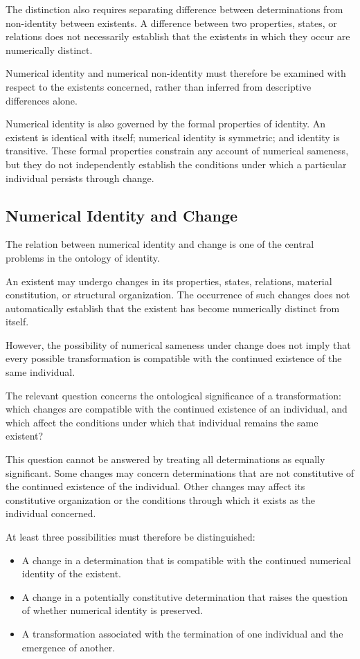 The distinction also requires separating
difference between determinations from
non-identity between existents. A difference
between two properties, states, or relations
does not necessarily establish that the
existents in which they occur are numerically
distinct.

Numerical identity and numerical non-identity
must therefore be examined with respect to
the existents concerned, rather than inferred
from descriptive differences alone.

Numerical identity is also governed by the
formal properties of identity. An existent
is identical with itself; numerical identity
is symmetric; and identity is transitive.
These formal properties constrain any
account of numerical sameness, but they
do not independently establish the conditions
under which a particular individual persists
through change.

\subsection{Numerical Identity and Change}

The relation between numerical identity
and change is one of the central problems
in the ontology of identity.

An existent may undergo changes in its
properties, states, relations, material
constitution, or structural organization.
The occurrence of such changes does not
automatically establish that the existent
has become numerically distinct from itself.

However, the possibility of numerical
sameness under change does not imply that
every possible transformation is compatible
with the continued existence of the same
individual.

The relevant question concerns the
ontological significance of a transformation:
which changes are compatible with the
continued existence of an individual, and
which affect the conditions under which
that individual remains the same existent?

This question cannot be answered by treating
all determinations as equally significant.
Some changes may concern determinations
that are not constitutive of the continued
existence of the individual. Other changes
may affect its constitutive organization
or the conditions through which it exists
as the individual concerned.

At least three possibilities must therefore
be distinguished:

\begin{itemize}
    \item A change in a determination that
    is compatible with the continued numerical
    identity of the existent.

    \item A change in a potentially constitutive
    determination that raises the question
    of whether numerical identity is preserved.

    \item A transformation associated with
    the termination of one individual and
    the emergence of another.
\end{itemize}

